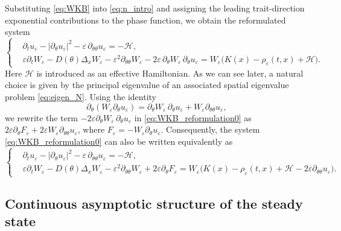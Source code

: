 \documentclass[11pt]{article}
\numberwithin{equation}{section}
\begin{document}
Substituting \eqref{eq:WKB} into \eqref{eq:n_intro} and assigning the leading trait-direction exponential contributions to the phase function, we obtain the reformulated system
\begin{equation}\label{eq:WKB_reformulation0}
\left\{
\begin{aligned}
& \partial_t u_\varepsilon
- |\partial_\theta u_\varepsilon|^2
- \varepsilon \, \partial_{\theta\theta} u_\varepsilon
= - \mathcal H, \\
& \varepsilon \partial_t W_\varepsilon
- D(\theta)\Delta_x W_\varepsilon
- \varepsilon^2 \partial_{\theta\theta} W_\varepsilon
- 2\varepsilon \, \partial_\theta W_\varepsilon \, \partial_\theta u_\varepsilon
= W_\varepsilon\bigl(K(x)-\rho_\varepsilon(t,x)+\mathcal H \bigr). 
\end{aligned}
\right.
\end{equation}
Here \(\mathcal H\) is introduced as an effective Hamiltonian. 
As we can see later, a natural choice is given by the principal eigenvalue of an associated spatial eigenvalue problem \eqref{eq:eigen_N}. 
Using the identity
\[
\partial_\theta(W_\varepsilon\partial_\theta u_\varepsilon)
=
\partial_\theta W_\varepsilon\,\partial_\theta u_\varepsilon
+
W_\varepsilon\partial_{\theta\theta}u_\varepsilon,
\]
we rewrite the term  $-2\varepsilon\partial_\theta W_\varepsilon\,\partial_\theta u_\varepsilon$ in \eqref{eq:WKB_reformulation0} as $2\varepsilon\partial_\theta F_\varepsilon+2\varepsilon W_\varepsilon\partial_{\theta\theta}u_\varepsilon$, where $F_\varepsilon = - W_\varepsilon\partial_\theta u_\varepsilon$. 
Consequently, the system \eqref{eq:WKB_reformulation0} can also be written equivalently as
\begin{equation}\label{eq:WKB_reformulation}
\left\{
\begin{aligned}
& \partial_t u_\varepsilon
- |\partial_\theta u_\varepsilon|^2
- \varepsilon \, \partial_{\theta\theta} u_\varepsilon
= - \mathcal H, \\
& \varepsilon \partial_t W_\varepsilon
- D(\theta)\Delta_x W_\varepsilon
- \varepsilon^2 \partial_{\theta\theta} W_\varepsilon
+2\varepsilon\partial_\theta F_\varepsilon
=
W_\varepsilon
\bigl(
K(x)-\rho_\varepsilon(t, x)
+\mathcal H
-2\varepsilon\partial_{\theta\theta}u_\varepsilon
\bigr).
\end{aligned}
\right.
\end{equation}



\subsection{Continuous asymptotic structure of the steady state}\label{subsec:continuous_asymptotic_structure}
\end{document}
